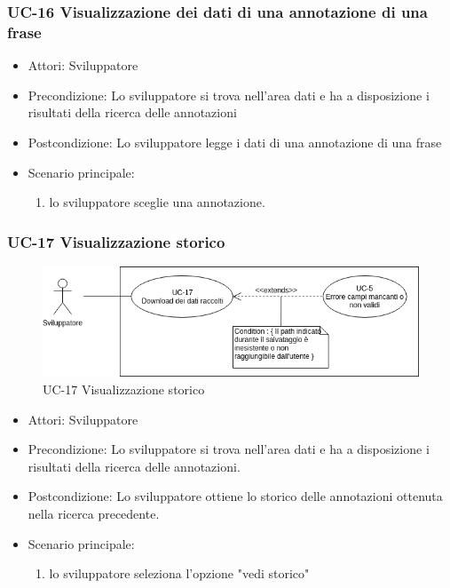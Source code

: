 	\subsubsection{UC-16 Visualizzazione dei dati di una annotazione di una frase}
		\begin{itemize}
			\item Attori: Sviluppatore
			\item Precondizione: Lo sviluppatore si trova nell'area dati e ha a disposizione i risultati della ricerca delle annotazioni
			\item Postcondizione: Lo sviluppatore legge i dati di una annotazione di una frase
			\item Scenario principale:
				\begin{enumerate}
					\item lo sviluppatore sceglie una annotazione.
				\end{enumerate}
		\end{itemize}
	
	\subsubsection{UC-17 Visualizzazione storico}
		\begin{figure}[h]
			\centering
			\includegraphics[scale=0.7]{images/UC-17.png}
			\caption{UC-17 Visualizzazione storico}
		\end{figure}	
		\begin{itemize}
			\item Attori: Sviluppatore
			\item Precondizione: Lo sviluppatore si trova nell'area dati e ha a disposizione i risultati della ricerca delle annotazioni.
			\item Postcondizione: Lo sviluppatore ottiene lo storico delle annotazioni ottenuta nella ricerca precedente.
			\item Scenario principale:
			\begin{enumerate}
				\item lo sviluppatore seleziona l'opzione "vedi storico"
			\end{enumerate}
		\end{itemize}
	
